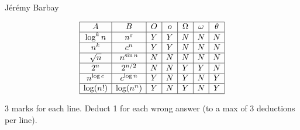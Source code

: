 \begin{solution}
\begin{authorship}J\'er\'emy Barbay\end{authorship}
$$
\begin{array}{|c|c|c|c|c|c|c|}\hline
  A          &	B               &   O   &   o   & \Omega&\omega &\theta \\	\hline
 \log^{k}n     &n^{\varepsilon }  &   Y	&   Y 	&  N	&  N	&  N	\\	\hline
 n^{k}       &	c^{n}           &   Y	&   Y	&  N	&  N	&  N	\\	\hline
 \sqrt{n}    &	n ^{\sin n}     &   N	&   N	&  N	&  N	&  N	\\	\hline
 2^{n}       &	2^{n/2}         &   N 	&   N	&  Y 	&  Y	&  N	\\	\hline
 n^{\log c}   &	c^{\log n}       &   Y	&   N	&  Y	&  N	&  Y	\\	\hline
 \log(n!)      &	\log (n^{n})     &   Y	&   N	&  Y	&  N	&  Y	\\	\hline
\end{array}
$$
\end{solution}
\begin{markingScheme}
3 marks for each line.  Deduct 1 for each wrong answer (to a max of
3 deductions per line).
\end{markingScheme}
